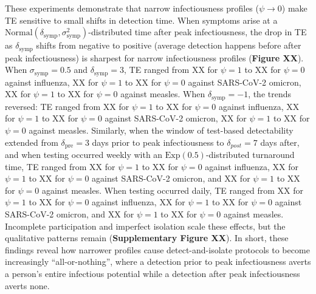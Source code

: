 These experiments demonstrate that narrow infectiousness profiles ($\psi \rightarrow 0$) make TE sensitive to small shifts in detection time. When symptoms arise at a $\text{Normal}(\delta_\text{symp}, \sigma_\text{symp}^2)$-distributed time after peak infectiousness, the drop in TE as $\delta_\text{symp}$ shifts from negative to positive (average detection happens before \vs after peak infectiousness) is sharpest for narrow infectiousness profiles ({\bf Figure XX}). When $\sigma_\text{symp} = 0.5$ and $\delta_\text{symp} = 3$, TE ranged from XX for $\psi = 1$ to XX for $\psi = 0$ against influenza, XX for $\psi = 1$ to XX for $\psi = 0$ against SARS-CoV-2 omicron, XX for $\psi = 1$ to XX for $\psi = 0$ against measles. When $\delta_\text{symp} = -1$, the trends reversed:  TE ranged from XX for $\psi = 1$ to XX for $\psi = 0$ against influenza, XX for $\psi = 1$ to XX for $\psi = 0$ against SARS-CoV-2 omicron, XX for $\psi = 1$ to XX for $\psi = 0$ against measles. Similarly, when the window of test-based detectability extended from $\delta_\text{pre} = 3$ days prior to peak infectiousness to $\delta_{post} = 7$ days after, and when testing occurred weekly with an $\text{Exp}(0.5)$-distributed turnaround time, TE ranged from XX for $\psi = 1$ to XX for $\psi = 0$ against influenza, XX for $\psi = 1$ to XX for $\psi = 0$ against SARS-CoV-2 omicron, and XX for $\psi = 1$ to XX for $\psi = 0$ against measles. When testing occurred daily, TE ranged from XX for $\psi = 1$ to XX for $\psi = 0$ against influenza, XX for $\psi = 1$ to XX for $\psi = 0$ against SARS-CoV-2 omicron, and XX for $\psi = 1$ to XX for $\psi = 0$ against measles. Incomplete participation and imperfect isolation scale these effects, but the qualitative patterns remain ({\bf Supplementary Figure XX}). In short, these findings reveal how narrower profiles cause detect-and-isolate protocols to become increasingly ``all-or-nothing'', where a detection prior to peak infectiousness averts a person's entire infectious potential while a detection after peak infectiousness averts none. 

